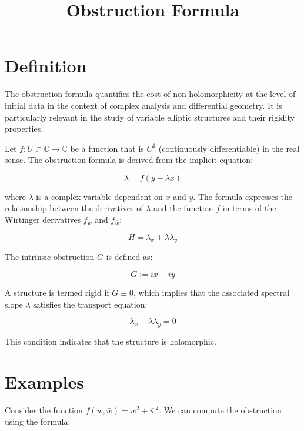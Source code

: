 \documentclass[11pt,a4paper]{article}
\title{Obstruction Formula}
\date{}
\begin{document}
\maketitle
\section{Definition}
The obstruction formula quantifies the cost of non-holomorphicity at the level of initial data in the context of complex analysis and differential geometry. It is particularly relevant in the study of variable elliptic structures and their rigidity properties. 

Let \( f: U \subset \mathbb{C} \to \mathbb{C} \) be a function that is \( C^1 \) (continuously differentiable) in the real sense. The obstruction formula is derived from the implicit equation:

\begin{equation}
\lambda = f(y - \lambda x)
\end{equation}

where \( \lambda \) is a complex variable dependent on \( x \) and \( y \). The formula expresses the relationship between the derivatives of \( \lambda \) and the function \( f \) in terms of the Wirtinger derivatives \( f_w \) and \( f_{\bar{w}} \):

\begin{equation}
H = \lambda_x + \lambda \lambda_y
\end{equation}

The intrinsic obstruction \( G \) is defined as:

\begin{equation}
G := i x + i y
\end{equation}

A structure is termed rigid if \( G \equiv 0 \), which implies that the associated spectral slope \( \lambda \) satisfies the transport equation:

\begin{equation}
\lambda_x + \lambda \lambda_y = 0
\end{equation}

This condition indicates that the structure is holomorphic.

\section{Examples}
Consider the function \( f(w, \bar{w}) = w^2 + \bar{w}^2 \). We can compute the obstruction using the formula:
\end{document}

